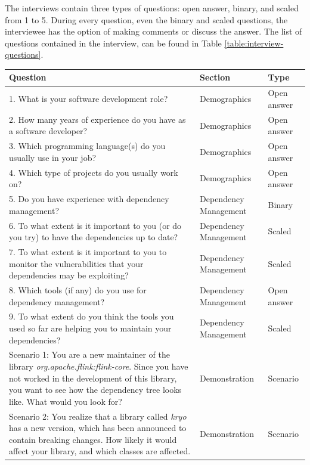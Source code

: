 The interviews contain three types of questions: open answer, binary, and scaled from 1 to 5. During every question, even the binary and scaled questions, the interviewee has the option of making comments or discuss the answer. The list of questions contained in the interview, can be found in Table \ref{table:interview-questions}.

\begin{table}[p]
    \begin{center}
    \begin{tabularx}{\textwidth}{|X|l|l|}
    \hline
    Question & Section & Type \\\hline
    \hline
    1.  What is your software development role?  & Demographics & Open answer \\\hline
    2.	How many years of experience do you have as a software developer? & Demographics & Open answer \\\hline
    3.	Which programming language(s) do you usually use in your job? & Demographics & Open answer \\\hline
    4.	Which type of projects do you usually work on? & Demographics & Open answer \\\hline
    \hline
    5.	Do you have experience with dependency management? & Dependency Management & Binary \\\hline
    6.	To what extent is it important to you (or do you try) to have the dependencies up to date? & Dependency Management & Scaled \\\hline
    7.	To what extent is it important to you to monitor the vulnerabilities that your dependencies may be exploiting? & Dependency Management & Scaled \\\hline
    8.	Which tools (if any) do you use for dependency management? & Dependency Management & Open answer \\\hline
    9.	To what extent do you think the tools you used so far are helping you to maintain your dependencies? & Dependency Management & Scaled \\\hline
    \hline
    Scenario 1: You are a new maintainer of the library \textit{org.apache.flink:flink-core}. Since you have not worked in the development of this library, you want to see how the dependency tree looks like. What would you look for? & Demonstration & Scenario \\\hline
    Scenario 2: You realize that a library called \textit{kryo} has a new version, which has been announced to contain breaking changes. How likely it would affect your library, and which classes are affected. & Demonstration & Scenario \\\hline

\end{tabularx}
\end{center}
\end{table}
